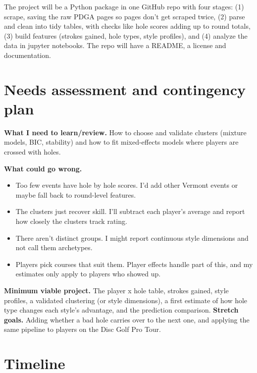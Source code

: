 \documentclass[10pt]{article}
\begin{document}
The project will be a Python package in one GitHub repo with four stages: (1) scrape, saving the raw PDGA pages so pages don't get scraped twice, (2) parse and clean into tidy tables, with checks like hole scores adding up to round totals, (3) build features (strokes gained, hole types, style profiles), and (4) analyze the data in jupyter notebooks. The repo will have a README, a license and documentation.

\section{Needs assessment and contingency plan}

\textbf{What I need to learn/review.}
How to choose and validate clusters (mixture models, BIC, stability) and how to fit mixed-effects models where players are crossed with holes.

\textbf{What could go wrong.}
\begin{itemize}
  \item Too few events have hole by hole scores. I'd add other Vermont
        events or maybe fall back to round-level features.
  \item The clusters just recover skill. I'll subtract each player's average
        and report how closely the clusters track rating.
  \item There aren't distinct groups. I might report continuous style dimensions
        and not call them archetypes.
  \item Players pick courses that suit them. Player effects handle part of
        this, and my estimates only apply to players who showed up.
\end{itemize}

\textbf{Minimum viable project.}
The player x hole table, strokes gained, style profiles, a validated clustering
(or style dimensions), a first estimate of how hole type changes each style's
advantage, and the prediction comparison.
\textbf{Stretch goals.}
Adding whether a bad hole carries over to the next one, and applying the same pipeline to players on the Disc Golf Pro Tour.

\section{Timeline}
\end{document}
